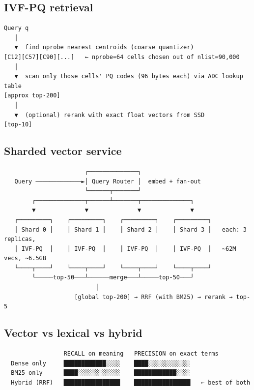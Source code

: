 \documentclass[11pt]{article}
\begin{document}
\subsection{IVF-PQ retrieval}\label{ivf-pq-retrieval}

\setcodelang{}

\begin{verbatim}
Query q
   │
   ▼  find nprobe nearest centroids (coarse quantizer)
[C12][C57][C90][...]   ← nprobe=64 cells chosen out of nlist=90,000
   │
   ▼  scan only those cells' PQ codes (96 bytes each) via ADC lookup table
[approx top-200]
   │
   ▼  (optional) rerank with exact float vectors from SSD
[top-10]
\end{verbatim}

\subsection{Sharded vector service}\label{sharded-vector-service}

\setcodelang{}

\begin{verbatim}
                       ┌──────────────┐
   Query ─────────────►│ Query Router │  embed + fan-out
                       └──────┬───────┘
        ┌──────────────┬──────┴───────┬──────────────┐
        ▼              ▼              ▼              ▼
   ┌─────────┐    ┌─────────┐    ┌─────────┐    ┌─────────┐
   │ Shard 0 │    │ Shard 1 │    │ Shard 2 │    │ Shard 3 │   each: 3 replicas,
   │ IVF-PQ  │    │ IVF-PQ  │    │ IVF-PQ  │    │ IVF-PQ  │   ~62M vecs, ~6.5GB
   └────┬────┘    └────┬────┘    └────┬────┘    └────┬────┘
        └─────top-50───┴──────merge───┴─────top-50───┘
                          │
                    [global top-200] → RRF (with BM25) → rerank → top-5
\end{verbatim}

\subsection{Vector vs lexical vs hybrid}\label{vector-vs-lexical-vs-hybrid}

\setcodelang{}

\begin{verbatim}
                 RECALL on meaning   PRECISION on exact terms
  Dense only     ████████████░░░░    ████░░░░░░░░░░░░
  BM25 only      ████░░░░░░░░░░░░    ████████████░░░░
  Hybrid (RRF)   ████████████████    ████████████████   ← best of both
\end{verbatim}
\end{document}
